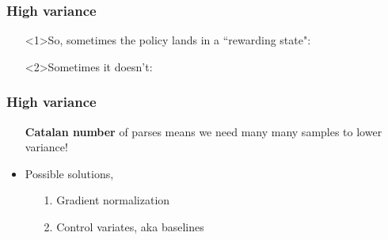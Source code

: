 \begin{frame}
\frametitle{High variance}

\begin{itemize}
\item[]<1>{So, sometimes the policy lands in a ``rewarding state":}\\
\end{itemize}


\begin{itemize}
\item[]<2>{Sometimes it doesn't:}
\end{itemize}


\end{frame}


\begin{frame}
\frametitle{High variance}
\begin{itemize}
\item[] \textbf{Catalan number} of parses means we need many many samples to lower variance!
\item<2->[] Possible solutions,
\begin{itemize}
\item[] 1. Gradient normalization
\item[] 2. Control variates, aka baselines
\end{itemize}
\end{itemize}
\end{frame}


